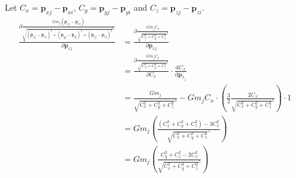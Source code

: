 \documentclass[12pt,letterpaper]{article}
\newcommand{\vep}{\bm{p}}
\newcommand{\der}[2]{\frac{\text{d} #1}{\text{d} #2}}
\newcommand{\pard}[2]{\frac{\partial #1}{\partial #2}}
\begin{document}
    Let $C_x = \vep_{xj}-\vep_{xi}$, $C_y = \vep_{yj}-\vep_{yi}$ and $C_z = \vep_{zj}-\vep_{zi}$.
    \begin{align*}
        \pard{\frac{Gm_j(\vep_{xj}-\vep_{xi})}{\sqrt{(\vep_{xj}-\vep_{xi})^2+(\vep_{yj}-\vep_{yi})^2+(\vep_{zj}-\vep_{zi})^2}^3}}{\vep_{xj}}
        &=\pard{\frac{Gm_jC_x}{\sqrt{C_x^2+C_y^2+C_z^2}^3}}{\vep_{xj}}\\
        &=\pard{\frac{Gm_jC_x}{\sqrt{C_x^2+C_y^2+C_z^2}^3}}{C_x}\cdot\der{C_x}{\vep_{x_j}}\\
        &=\frac{Gm_j}{\sqrt{C_x^2+C_y^2+C_z^2}^3}-Gm_jC_x\cdot\left(\frac{3}{2}\frac{2C_x}{\sqrt{C_x^2+C_y^2+C_z^2}^5}\right)\cdot1\\
        &=Gm_j\left(\frac{(C_x^2+C_y^2+C_z^2)-3C_x^2}{\sqrt{C_x^2+C_y^2+C_z^2}^5}\right)\\
        &=Gm_j\left(\frac{C_y^2+C_z^2-2C_x^2}{\sqrt{C_x^2+C_y^2+C_z^2}^5}\right)\\
    \end{align*}
\end{document}
